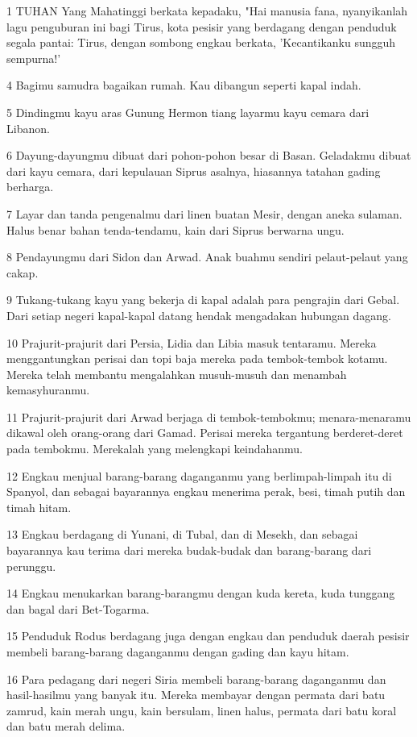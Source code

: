 \par 1 TUHAN Yang Mahatinggi berkata kepadaku, "Hai manusia fana, nyanyikanlah lagu penguburan ini bagi Tirus, kota pesisir yang berdagang dengan penduduk segala pantai: Tirus, dengan sombong engkau berkata, 'Kecantikanku sungguh sempurna!'
\par 4 Bagimu samudra bagaikan rumah. Kau dibangun seperti kapal indah.
\par 5 Dindingmu kayu aras Gunung Hermon tiang layarmu kayu cemara dari Libanon.
\par 6 Dayung-dayungmu dibuat dari pohon-pohon besar di Basan. Geladakmu dibuat dari kayu cemara, dari kepulauan Siprus asalnya, hiasannya tatahan gading berharga.
\par 7 Layar dan tanda pengenalmu dari linen buatan Mesir, dengan aneka sulaman. Halus benar bahan tenda-tendamu, kain dari Siprus berwarna ungu.
\par 8 Pendayungmu dari Sidon dan Arwad. Anak buahmu sendiri pelaut-pelaut yang cakap.
\par 9 Tukang-tukang kayu yang bekerja di kapal adalah para pengrajin dari Gebal. Dari setiap negeri kapal-kapal datang hendak mengadakan hubungan dagang.
\par 10 Prajurit-prajurit dari Persia, Lidia dan Libia masuk tentaramu. Mereka menggantungkan perisai dan topi baja mereka pada tembok-tembok kotamu. Mereka telah membantu mengalahkan musuh-musuh dan menambah kemasyhuranmu.
\par 11 Prajurit-prajurit dari Arwad berjaga di tembok-tembokmu; menara-menaramu dikawal oleh orang-orang dari Gamad. Perisai mereka tergantung berderet-deret pada tembokmu. Merekalah yang melengkapi keindahanmu.
\par 12 Engkau menjual barang-barang daganganmu yang berlimpah-limpah itu di Spanyol, dan sebagai bayarannya engkau menerima perak, besi, timah putih dan timah hitam.
\par 13 Engkau berdagang di Yunani, di Tubal, dan di Mesekh, dan sebagai bayarannya kau terima dari mereka budak-budak dan barang-barang dari perunggu.
\par 14 Engkau menukarkan barang-barangmu dengan kuda kereta, kuda tunggang dan bagal dari Bet-Togarma.
\par 15 Penduduk Rodus berdagang juga dengan engkau dan penduduk daerah pesisir membeli barang-barang daganganmu dengan gading dan kayu hitam.
\par 16 Para pedagang dari negeri Siria membeli barang-barang daganganmu dan hasil-hasilmu yang banyak itu. Mereka membayar dengan permata dari batu zamrud, kain merah ungu, kain bersulam, linen halus, permata dari batu koral dan batu merah delima.
